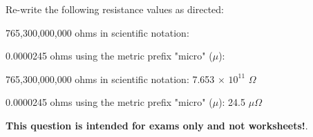 

Re-write the following resistance values as directed:

\vskip 10pt

765,300,000,000 ohms in scientific notation: \underbar{\hskip 100pt}

\vskip 10pt

0.0000245 ohms using the metric prefix "micro" ($\mu$): \underbar{\hskip 100pt}







\vskip 10pt

765,300,000,000 ohms in scientific notation: 7.653 $\times$ $10^{11}$ $\Omega$

\vskip 10pt

0.0000245 ohms using the metric prefix "micro" ($\mu$): 24.5 $\mu \Omega$







{\bf This question is intended for exams only and not worksheets!}.



